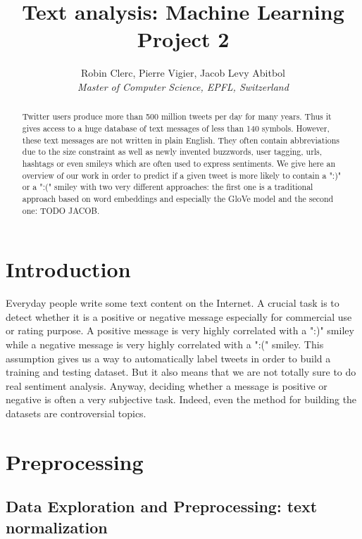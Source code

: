 \documentclass[10pt,conference,compsocconf]{IEEEtran}
\begin{document}
\title{Text analysis: Machine Learning Project 2}

\author{
  Robin Clerc, Pierre Vigier, Jacob Levy Abitbol\\
  \textit{Master of Computer Science, EPFL, Switzerland}
}

\maketitle

\begin{abstract}
Twitter users produce more than 500 million tweets per day for many years. Thus it gives access to a huge database of text messages of less than 140 symbols. However, these text messages are not written in plain English. They often contain abbreviations due to the size constraint as well as newly invented buzzwords, user tagging, urls, hashtags or even smileys which are often used to express sentiments. We give here an overview of our work in order to predict if a given tweet is more likely to contain a ":)" or a ":(" smiley with two very different approaches: the first one is a traditional approach based on word embeddings and especially the GloVe model and the second one: TODO JACOB.
\end{abstract}

\section{Introduction}

Everyday people write some text content on the Internet. A crucial task is to detect whether it is a positive or negative message especially for commercial use or rating purpose. A positive message is very highly correlated with a ":)" smiley while a negative message is very highly correlated with a ":(" smiley. This assumption gives us a way to automatically label tweets in order to build a training and testing dataset. But it also means that we are not totally sure to do real sentiment analysis. Anyway, deciding whether a message is positive or negative is often a very subjective task. Indeed, even the method for building the datasets are controversial topics.

\section{Preprocessing}
\label{sec:structure-paper}

\subsection{Data Exploration and Preprocessing: text normalization}
\end{document}
